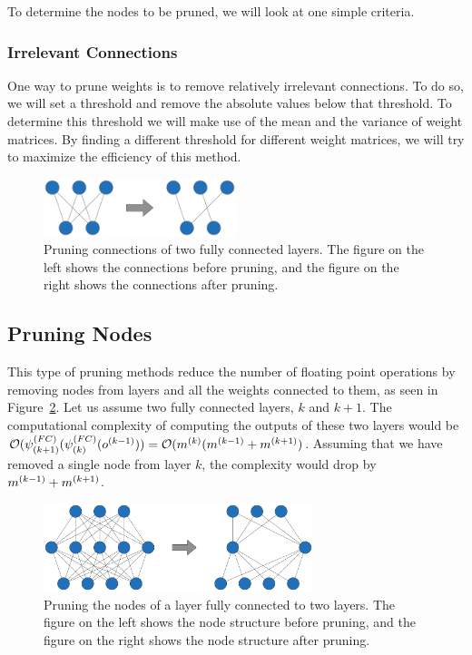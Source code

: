 To determine the nodes to be pruned, we will look at one simple criteria.

\subsubsection{Irrelevant Connections}
One way to prune weights is to remove relatively irrelevant connections. To do so, we will set a threshold and remove the absolute values below that threshold. To determine this threshold we will make use of the mean and the variance of weight matrices. By finding a different threshold for different weight matrices, we will try to maximize the efficiency of this method.

\begin{figure}[!h]
  \begin{center}
  \includegraphics[width=0.5\textwidth]{images/weight_pruning.pdf}
  \end{center}
  \caption{Pruning connections of two fully connected layers. The figure on the left shows the connections before pruning, and the figure on the right shows the connections after pruning.}
  \label{fig:weight_pruning}
\end{figure}

\newpage
\subsection{Pruning Nodes}
\label{sec:pruning_nodes}
This type of pruning methods reduce the number of floating point operations by removing nodes from layers and all the weights connected to them, as seen in Figure~\ref{fig:node_pruning}. Let us assume two fully connected layers, $k$ and $k+1$. The computational complexity of computing the outputs of these two layers would be $\mathcal{O}(\psi^{(FC)}_{(k+1)}(\psi^{(FC)}_{(k)}(o^{(k-1)})) = \mathcal{O}(m^{(k)}(m^{(k-1)} + m^{(k+1)})$. Assuming that we have removed a single node from layer $k$, the complexity would drop by $m^{(k-1)} + m^{(k+1)}$. 

\begin{figure}[!h]
  \begin{center}
  \includegraphics[width=0.7\textwidth]{images/node_pruning.pdf}
  \end{center}
  \caption{Pruning the nodes of a layer fully connected to two layers. The figure on the left shows the node structure before pruning, and the figure on the right shows the node structure after pruning.}
  \label{fig:node_pruning}
\end{figure}

